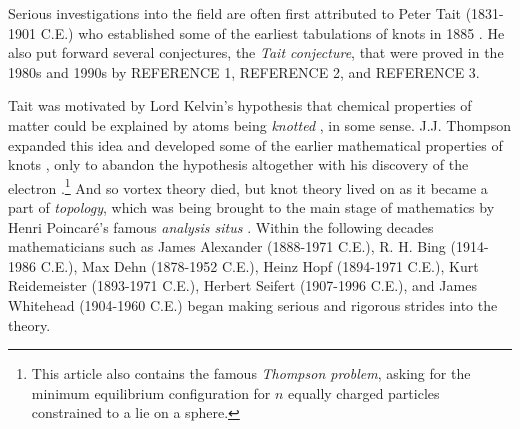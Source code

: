 Serious investigations into the field are often first attributed to Peter Tait
(1831-1901 C.E.) who established some of the earliest tabulations of knots
in 1885 \cite{TaitOnKnots1885}. He also put forward several conjectures,
the \textit{Tait conjecture}, that were proved in the 1980s and 1990s by
REFERENCE 1, REFERENCE 2, and REFERENCE 3.
\par\hfill\par
Tait was motivated by Lord Kelvin's hypothesis that chemical properties
of matter could be explained by atoms being \textit{knotted}
\cite{ThompsonVortex1867}, in some sense. J.J. Thompson expanded this idea and
developed some of the earlier mathematical properties of knots
\cite{ThompsonVortexRings1883}, only to abandon the hypothesis altogether with
his discovery of the electron \cite{ThompsonStructureOfAtoms1904}.\footnote{%
    This article also contains the famous \textit{Thompson problem}, asking for
    the minimum equilibrium configuration for $n$ equally charged particles
    constrained to a lie on a sphere.
}
And so vortex theory died, but knot theory lived on as it became a part of
\textit{topology}, which was being brought to the main stage of mathematics
by Henri Poincar\'{e}'s famous \textit{analysis situs}
\cite{PoincareAnalysisSitus1895}. Within the following decades mathematicians
such as James Alexander (1888-1971 C.E.), R. H. Bing (1914-1986 C.E.),
Max Dehn (1878-1952 C.E.), Heinz Hopf (1894-1971 C.E.),
Kurt Reidemeister (1893-1971 C.E.), Herbert Seifert (1907-1996 C.E.),
and James Whitehead (1904-1960 C.E.) began making serious and rigorous strides
into the theory.
